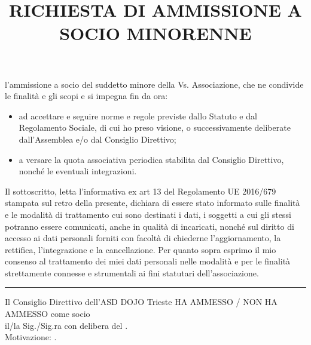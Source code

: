 \documentclass{djtsmod}
\title{RICHIESTA DI AMMISSIONE A SOCIO MINORENNE}
\begin{document}
	\maketitle
	
	
	\basedata
	
	\vspace{0.2in}
	\childbasedata
	
	l'ammissione a socio del suddetto minore della Vs. Associazione, che ne condivide le finalità e gli scopi e si impegna fin da ora:
	\begin{itemize}
		\item ad accettare e seguire norme e regole previste dallo Statuto e dal Regolamento Sociale, di cui ho preso visione, o successivamente deliberate dall'Assemblea e/o dal Consiglio Direttivo;
		\item a versare la quota associativa periodica stabilita dal Consiglio Direttivo, nonché le eventuali integrazioni.
	\end{itemize}
	
	\vspace{10pt}
	Il sottoscritto, letta l’informativa ex art 13 del Regolamento UE 2016/679 stampata sul retro della presente, dichiara di essere stato informato sulle finalità e le modalità di trattamento cui sono destinati i dati, i soggetti a cui gli stessi potranno essere comunicati, anche in qualità di incaricati, nonché sul diritto di accesso ai dati personali forniti con facoltà di chiederne l’aggiornamento, la rettifica, l’integrazione e la cancellazione.
	Per quanto sopra esprimo il mio consenso al trattamento dei miei dati personali nelle modalità e per le finalità strettamente connesse e strumentali ai fini statutari dell'associazione.
	
	\vspace{0.2in}
	\hrule
	
	Il Consiglio Direttivo dell'ASD DOJO Trieste HA AMMESSO / NON HA AMMESSO come socio\\ il/la Sig./Sig.ra \fieldfill\; con delibera del \field{2in}. \\
	Motivazione: \fieldfill.
	
	\vspace{0.2in}
	
\end{document}
